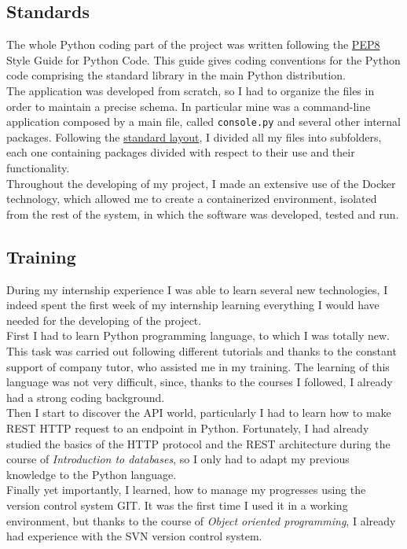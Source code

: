 \documentclass[12pt, a4paper, oneside]{article}
\begin{document}
\subsection{Standards}
The whole Python coding part of the project was written following the \href{https://peps.python.org/pep-0008/}{PEP8} Style Guide for Python Code.
This guide gives coding conventions for the Python code comprising the standard library in the main Python distribution.\\
The application was developed from scratch, so I had to organize the files in order to maintain a precise schema. In particular mine was a command-line application composed by a main file, called \texttt{console.py}
and several other internal packages. Following the \href{https://docs.python-guide.org/writing/structure/}{standard layout}, I divided all my files into subfolders, each one containing packages divided with
respect to their use and their functionality.\\
Throughout the developing of my project, I made an extensive use of the Docker technology, which allowed me to create a containerized environment, isolated from the rest of the system,
in which the software was developed, tested and run.

\subsection{Training}
During my internship experience I was able to learn several new technologies, I indeed spent the first week of my internship learning everything I would have needed for the developing of the project.\\
First I had to learn Python programming language, to which I was totally new. This task was carried out following different tutorials and thanks to the constant support of company tutor, who assisted me in
my training. The learning of this language was not very difficult, since, thanks to the courses I followed, I already had a strong coding background.\\
Then I start to discover the API world, particularly I had to learn how to make REST HTTP request to an endpoint in Python. Fortunately, I had already studied the basics of the HTTP protocol and the REST architecture
during the course of \emph{Introduction to databases}, so I only had to adapt my previous knowledge to the Python language.\\
Finally yet importantly, I learned, how to manage my progresses using the version control system GIT. It was the first time I used it in a working environment, but thanks to the course of \emph{Object oriented programming},
I already had experience with the SVN version control system.
\end{document}
